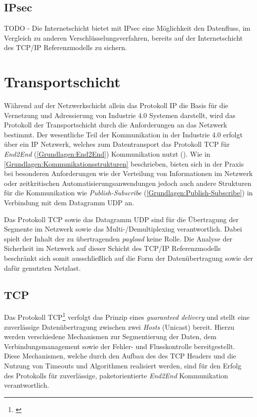 \subsection{IPsec}
TODO - Die Internetschicht bietet mit IPsec eine Möglichkeit den Datenfluss, im Vergleich zu anderen Verschlüsselungsverfahren, bereits auf der Internetschicht des \ac{TCP}/\ac{IP} Referenzmodells zu sichern.

\section{Transportschicht}
\label{Analyse:Transportschicht}
Während auf der Netzwerkschicht allein das Protokoll \ac{IP} die Basis für die Vernetzung und Adressierung von Industrie 4.0 Systemen darstellt, wird das Protokoll der Transportschicht durch die Anforderungen an das Netzwerk bestimmt. Der wesentliche Teil der Kommunikation in der Industrie 4.0 erfolgt über ein \ac{IP} Netzwerk, welches zum Datentransport das Protokoll \ac{TCP} für \textit{End2End} (\autoref{Grundlagen:End2End}) Kommunikation nutzt (\cite{sichKom2017}). Wie in \autoref{Grundlagen:Kommunikationsstrukturen} beschrieben, bieten sich in der Praxis bei besonderen Anforderungen wie der Verteilung von Informationen im Netzwerk oder zeitkritischen Automatisierungsanwendungen jedoch auch andere Strukturen für die Kommunikation wie \textit{Publish-Subscribe} (\autoref{Grundlagen:Publish-Subscribe}) in Verbindung mit dem Datagramm \ac{UDP} an. 

Das Protokoll \ac{TCP} sowie das Datagramm \ac{UDP} sind für die Übertragung der Segmente im Netzwerk sowie das Multi-/Demultiplexing verantwortlich. Dabei spielt der Inhalt der zu übertragenden \textit{payload} keine Rolle. Die Analyse der Sicherheit im Netzwerk auf dieser Schicht des \ac{TCP}/\ac{IP} Referenzmodells beschränkt sich somit ausschließlich auf die Form der Datenübertragung sowie der dafür genutzten Netzlast.

\subsection{\ac{TCP}}
\label{Analyse:TCP}
Das Protokoll \ac{TCP}\footnote{\cite{TCP}} verfolgt das Prinzip eines \textit{guaranteed delivery} und stellt eine zuverlässige Datenübertragung zwischen zwei \textit{Hosts} (Unicast) bereit. Hierzu werden verschiedene Mechanismen zur Segmentierung der Daten, dem Verbindungsmanagement sowie der Fehler- und Flusskontrolle bereitgestellt. Diese Mechanismen, welche durch den Aufbau des des \ac{TCP} Headers und die Nutzung von Timeouts und Algorithmen realisiert werden, sind für den Erfolg des Protokolls für zuverlässige, paketorientierte \textit{End2End} Kommunikation verantwortlich.

